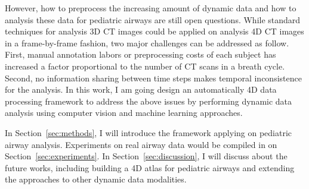 However, how to preprocess the increasing amount of dynamic data and how to analysis these data for pediatric airways are still open questions.
While standard techniques for analysis 3D CT images could be applied on analysis 4D CT images in a frame-by-frame fashion, two major challenges can be addressed as follow.
First, manual annotation labors or preprocessing costs of each subject has increased a factor proportional to the number of CT scans in a breath cycle.
Second, no information sharing between time steps makes temporal inconsistence for the analysis.
In this work, I am going design an automatically 4D data processing framework to address the above issues by performing dynamic data analysis using computer vision and machine learning approaches.

In Section~\ref{sec:methods}, I will introduce the framework applying on pediatric airway analysis.
Experiments on real airway data would be compiled in on Section~\ref{sec:experiments}.
In Section~\ref{sec:discussion}, I will discuss about the future works, including building a 4D atlas for pediatric airways and extending the approaches to other dynamic data modalities.
